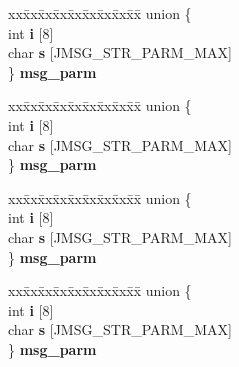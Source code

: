 \begin{DoxyCompactItemize}
\begin{tabbing}
\end{tabbing}\item 
\mbox{\label{structjpeg__error__mgr_abcbf4e18742719accf52bc4854d011fc}} 
\begin{tabbing}
xx\=xx\=xx\=xx\=xx\=xx\=xx\=xx\=xx\=\kill
union \{\\
\>int {\bfseries i} \mbox{[}8\mbox{]}\\
\>char {\bfseries s} \mbox{[}JMSG\_STR\_PARM\_MAX\mbox{]}\\
\} {\bfseries msg\_parm}\\

\end{tabbing}\item 
\mbox{\label{structjpeg__error__mgr_abbc3a805ddb2b9c4f005417efd897185}} 
\begin{tabbing}
xx\=xx\=xx\=xx\=xx\=xx\=xx\=xx\=xx\=\kill
union \{\\
\>int {\bfseries i} \mbox{[}8\mbox{]}\\
\>char {\bfseries s} \mbox{[}JMSG\_STR\_PARM\_MAX\mbox{]}\\
\} {\bfseries msg\_parm}\\

\end{tabbing}\item 
\mbox{\label{structjpeg__error__mgr_ac1036b5507eaec2d63aea16db713a976}} 
\begin{tabbing}
xx\=xx\=xx\=xx\=xx\=xx\=xx\=xx\=xx\=\kill
union \{\\
\>int {\bfseries i} \mbox{[}8\mbox{]}\\
\>char {\bfseries s} \mbox{[}JMSG\_STR\_PARM\_MAX\mbox{]}\\
\} {\bfseries msg\_parm}\\

\end{tabbing}\item 
\mbox{\label{structjpeg__error__mgr_aa26518c25f65ab107d24b5e1e44de69b}} 
\begin{tabbing}
xx\=xx\=xx\=xx\=xx\=xx\=xx\=xx\=xx\=\kill
union \{\\
\>int {\bfseries i} \mbox{[}8\mbox{]}\\
\>char {\bfseries s} \mbox{[}JMSG\_STR\_PARM\_MAX\mbox{]}\\
\} {\bfseries msg\_parm}\\


\end{tabbing}
\end{DoxyCompactItemize}
